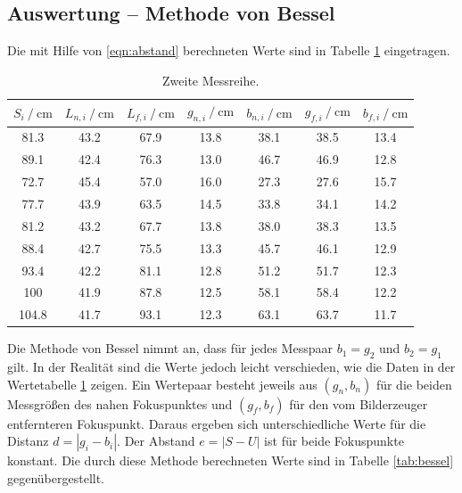 \subsection{Auswertung -- Methode von Bessel}
Die mit Hilfe von \eqref{eqn:abstand} berechneten Werte sind in Tabelle \ref{tab:mess2} eingetragen. 

\begin{table}
    \centering
    \caption{Zweite Messreihe.}
    \begin{tabular}{c c c c c c c}
        \toprule
        {$S_i \:/\: \si{\centi\meter}$} & {$L_{n,i} \:/\: \si{\centi\meter}$} & {$L_{f,i} \:/\: \si{\centi\meter}$} & {$g_{n,i} \:/\: \si{\centi\meter}$} & {$b_{n,i} \:/\: \si{\centi\meter}$}   &
        {$g_{f,i} \:/\: \si{\centi\meter}$} & {$b_{f,i} \:/\: \si{\centi\meter}$} \\
        \midrule
        81.3  &  43.2 &   67.9  &  13.8 &	38.1 &	38.5 &	13.4  \\
        89.1  &  42.4 &   76.3  &  13.0 &	46.7 &	46.9 &	12.8  \\
        72.7  &  45.4 &   57.0  &  16.0 &	27.3 &	27.6 &	15.7  \\
        77.7  &  43.9 &   63.5  &  14.5 &	33.8 &	34.1 &	14.2  \\
        81.2  &  43.2 &   67.7  &  13.8 &	38.0 &	38.3 &	13.5  \\
        88.4  &  42.7 &   75.5  &  13.3 &	45.7 &	46.1 &	12.9  \\
        93.4  &  42.2 &   81.1  &  12.8 &	51.2 &	51.7 &	12.3  \\
        100   &  41.9 &   87.8  &  12.5 &	58.1 &	58.4 &	12.2  \\
        104.8 &  41.7 &   93.1  &  12.3 &	63.1 &	63.7 &	11.7  \\
    \end{tabular}
    \label{tab:mess2}
\end{table}
Die Methode von Bessel nimmt an, dass für jedes Messpaar $b_1=g_2$ und $b_2=g_1$ gilt. In der Realität sind die Werte jedoch leicht verschieden, wie die Daten in der Wertetabelle \ref{tab:mess2}
zeigen. Ein Wertepaar besteht jeweils aus $(g_n, b_n)$ für die beiden Messgrößen des nahen Fokuspunktes und $(g_f, b_f)$ für den vom Bilderzeuger entfernteren Fokuspunkt.
Daraus ergeben sich unterschiedliche Werte für die Distanz $d = |g_i - b_i|$. Der Abstand $e = |S - U|$ ist für beide Fokuspunkte konstant.
Die durch diese Methode berechneten Werte sind in Tabelle \ref{tab:bessel} gegenübergestellt.


